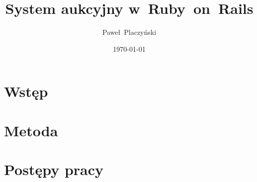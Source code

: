 \documentclass[12pt]{report}
\author{Paweł~Placzyński}
\title{System aukcyjny w~Ruby~on~Rails}
\date{\today}
\begin{document}
\maketitle

\tableofcontents

\chapter{Wstęp}





%

%

\chapter{Metoda}









\chapter{Postępy pracy}



%





\end{document}
